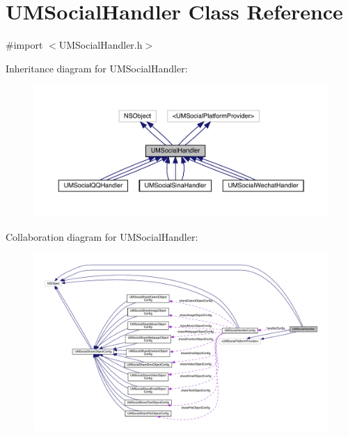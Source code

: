 \hypertarget{interface_u_m_social_handler}{}\section{U\+M\+Social\+Handler Class Reference}
\label{interface_u_m_social_handler}


{\ttfamily \#import $<$U\+M\+Social\+Handler.\+h$>$}



Inheritance diagram for U\+M\+Social\+Handler\+:\nopagebreak
\begin{figure}[H]
\begin{center}
\leavevmode
\includegraphics[width=350pt]{interface_u_m_social_handler__inherit__graph}
\end{center}
\end{figure}


Collaboration diagram for U\+M\+Social\+Handler\+:\nopagebreak
\begin{figure}[H]
\begin{center}
\leavevmode
\includegraphics[width=350pt]{interface_u_m_social_handler__coll__graph}
\end{center}
\end{figure}
